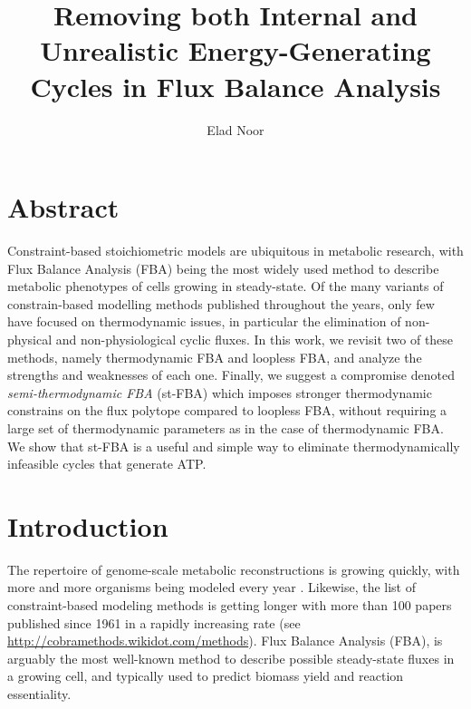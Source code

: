 \documentclass[twocolumn]{article}
\title{Removing both Internal and Unrealistic Energy-Generating Cycles in Flux Balance Analysis}
\author{Elad Noor}
\begin{document}
\maketitle

\section{Abstract}
Constraint-based stoichiometric models are ubiquitous in metabolic research, with Flux Balance Analysis (FBA) being the most widely used method to describe metabolic phenotypes of cells growing in steady-state. Of the many variants of constrain-based modelling methods published throughout the years, only few have focused on thermodynamic issues, in particular the elimination of non-physical and non-physiological cyclic fluxes. In this work, we revisit two of these methods, namely thermodynamic FBA and loopless FBA, and analyze the strengths and weaknesses of each one. Finally, we suggest a compromise denoted \textit{semi-thermodynamic FBA} (st-FBA) which imposes stronger thermodynamic constrains on the flux polytope compared to loopless FBA, without requiring a large set of thermodynamic parameters as in the case of thermodynamic FBA. We show that st-FBA is a useful and simple way to eliminate thermodynamically infeasible cycles that generate ATP.

\section{Introduction}
The repertoire of genome-scale metabolic reconstructions is growing quickly, with more and more organisms being modeled every year \cite{King2016-it}. Likewise, the list of constraint-based modeling methods is getting longer with more than 100 papers published since 1961 in a rapidly increasing rate \cite{Lewis2012-mu} (see \url{http://cobramethods.wikidot.com/methods}). Flux Balance Analysis (FBA), is arguably the most well-known method to describe possible steady-state fluxes in a growing cell, and typically used to predict biomass yield and reaction essentiality. 
\end{document}
